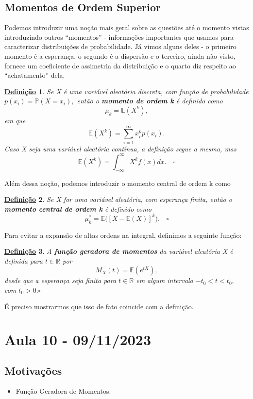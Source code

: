 \documentclass{article}
\newtheorem*{def*}{\underline{Defini\c c\~ao}}
\begin{document}
\subsection{Momentos de Ordem Superior}
Podemos introduzir uma noção mais geral sobre as questões até o momento vistas introduzindo outros ``momentos'' - informações importantes que usamos 
para caracterizar distribuições de probabilidade. Já vimos alguns deles - o primeiro momento é a esperança, o segundo é a dispersão e o terceiro, ainda não
visto, fornece um coeficiente de assimetria da distribuição e o quarto diz respeito ao ``achatamento'' dela.
\begin{def*}
  Se X é uma variável aleatória discreta, com função de probabilidade \(p(x_{i}) = \mathbb{P}(X = x_{i}),\) então o \textbf{momento de ordem k}
  é definido como 
  \[
    \mu_{k} = \mathbb{E}(X^{k}),
  \]
  em que 
  \[
    \mathbb{E}(X^{k}) = \sum\limits_{i=1}^{\infty}x_{i}^{k}p(x_{i}).
  \]
  Caso X seja uma variável aleatória contínua, a definição segue a mesma, mas 
  \[
    \mathbb{E}(X^{k}) = \int_{-\infty}^{\infty}X^{k}f(x)dx.\quad\square
  \]
\end{def*}
Além dessa noção, podemos introduzir o momento central de ordem k como
\begin{def*}
  Se X for uma variável aleatória, com esperança finita, então o \textbf{momento central de ordem k} é definido como 
  \[
    \mu_{k}^{*} = \mathbb{E}\biggl([X-\mathbb{E}(X)]^{k}\biggr).\quad\square
  \]
\end{def*}
Para evitar a expansão de altas ordens na integral, definimos a seguinte função:
\begin{def*}
  A \textbf{função geradora de momentos} da variável aleatória X é definida para \(t\in \mathbb{R}\) por 
  \[
    M_{X}(t) = \mathbb{E}(e^{tX}),
  \]
  desde que a esperança seja finita para \(t\in \mathbb{R}\) em algum intervalo \(-t_{0} < t < t_{0},\) com \(t_{0} > 0.\square\)
\end{def*}
É preciso mostrarmos que isso de fato coincide com a definição.
\newpage

\section{Aula 10 - 09/11/2023}
\subsection{Motivações}
\begin{itemize}
  \item Função Geradora de Momentos.
\end{itemize}
\end{document}
